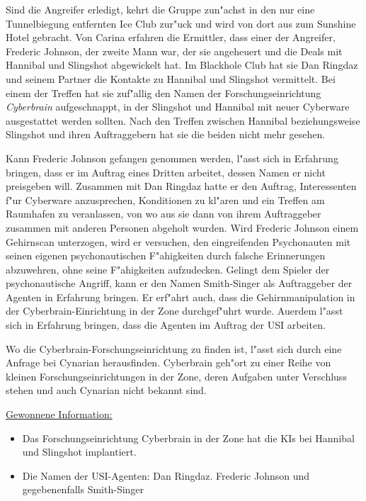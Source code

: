 Sind die Angreifer erledigt, kehrt die Gruppe zun"achst in den nur eine Tunnelbiegung entfernten Ice Club zur"uck und wird von dort aus zum Sunshine Hotel gebracht. Von Carina erfahren die Ermittler, dass einer der Angreifer, Frederic Johnson, der zweite Mann war, der sie angeheuert und die Deals mit Hannibal und Slingshot abgewickelt hat. Im Blackhole Club hat sie Dan Ringdaz und seinem Partner die Kontakte zu Hannibal und Slingshot vermittelt. Bei einem der Treffen hat sie zuf"allig den Namen der Forschungseinrichtung \emph{Cyberbrain} aufgeschnappt, in der Slingshot und Hannibal mit neuer Cyberware ausgestattet werden sollten. Nach den Treffen zwischen Hannibal beziehungsweise Slingshot und ihren Auftraggebern hat sie die beiden nicht mehr gesehen.

Kann Frederic Johnson gefangen genommen werden, l"asst sich in Erfahrung bringen, dass er im Auftrag eines Dritten arbeitet, dessen Namen er nicht preisgeben will. Zusammen mit Dan Ringdaz hatte er den Auftrag, Interessenten f"ur Cyberware anzusprechen, Konditionen zu kl"aren und ein Treffen am Raumhafen zu veranlassen, von wo aus sie dann von ihrem Auftraggeber zusammen mit anderen Personen abgeholt wurden. Wird Frederic Johnson einem Gehirnscan unterzogen, wird er versuchen, den eingreifenden Psychonauten mit seinen eigenen psychonautischen F"ahigkeiten durch falsche Erinnerungen abzuwehren, ohne seine F"ahigkeiten aufzudecken. Gelingt dem Spieler der psychonautische Angriff, kann er den Namen Smith-Singer als Auftraggeber der Agenten in Erfahrung bringen. Er erf"ahrt auch, dass die Gehirnmanipulation in der Cyberbrain-Einrichtung in der Zone durchgef"uhrt wurde. Au\3erdem l"asst sich in Erfahrung bringen, dass die Agenten im Auftrag der USI arbeiten.

Wo die Cyberbrain-Forschungseinrichtung zu finden ist, l"asst sich durch eine Anfrage bei Cynarian herausfinden. Cyberbrain geh"ort zu einer Reihe von kleinen Forschungseinrichtungen in der Zone, deren Aufgaben unter Verschluss stehen und auch Cynarian nicht bekannt sind.

\begin{remarks}
	\underline{Gewonnene Information:}
	
	\begin{itemize}
		\item Das Forschungseinrichtung Cyberbrain in der Zone hat die KIs bei Hannibal und Slingshot implantiert.
		\item Die Namen der USI-Agenten: Dan Ringdaz. Frederic Johnson und gegebenenfalls Smith-Singer
	\end{itemize}
\end{remarks}
